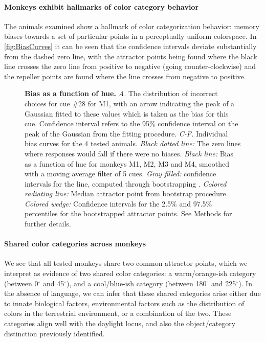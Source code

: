 
\paragraph{Monkeys exhibit hallmarks of color category behavior}

The animals examined show a hallmark of color categorization behavior: memory biases towards a set of particular points in a perceptually uniform colorspace.
In \autoref{fig:BiasCurves} it can be seen that the confidence intervals deviate substantially from the dashed zero line, with the attractor points being found where the black line crosses the zero line from positive to negative (going counter-clockwise) and the repeller points are found where the line crosses from negative to positive. 

\begin{figure}

\caption{\textbf{Bias as a function of hue.} 
\emph{A.} The distribution of incorrect choices for cue \#28 for M1, with an arrow indicating the peak of a Gaussian fitted to these values which is taken as the bias for this cue. Confidence interval refers to the 95\% confidence interval on the peak of the Gaussian from the fitting procedure.
\emph{C-F.} Individual bias curves for the 4 tested animals.
\emph{Black dotted line:} The zero lines where responses would fall if there were no biases.
\emph{Black line:} Bias as a function of hue for monkeys M1, M2, M3 and M4, smoothed with a moving average filter of 5 cues. 
\emph{Gray filled:} confidence intervals for the line, computed through bootstrapping . 
\emph{Colored radiating line:} Median attractor point from bootstrap procedure.
\emph{Colored wedge:} Confidence intervals for the 2.5\% and 97.5\% percentiles for the bootstrapped attractor points.
See Methods for further details.} %
\label{fig:BiasCurves}
\end{figure}


\paragraph{Shared color categories across monkeys}

We see that all tested monkeys share two common attractor points, which we interpret as evidence of two shared color categories: a warm/orange-ish category (between 0$^\circ$ and 45$^\circ$), and a cool/blue-ish category (between 180$^\circ$ and 225$^\circ$).
In the absence of language, we can infer that these shared categories arise either due to innate biological factors, environmental factors such as the distribution of colors in the terrestrial environment, or a combination of the two.
These categories align well with the daylight locus, and also the object/category distinction previously identified.

